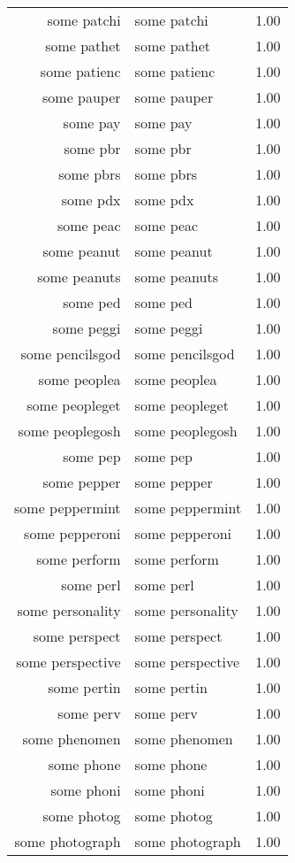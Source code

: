 \begin{table}[ht]
\begin{tabular}{rlr}
  some patchi & some patchi & 1.00 \\ 
  some pathet & some pathet & 1.00 \\ 
  some patienc & some patienc & 1.00 \\ 
  some pauper & some pauper & 1.00 \\ 
  some pay & some pay & 1.00 \\ 
  some pbr & some pbr & 1.00 \\ 
  some pbrs & some pbrs & 1.00 \\ 
  some pdx & some pdx & 1.00 \\ 
  some peac & some peac & 1.00 \\ 
  some peanut & some peanut & 1.00 \\ 
  some peanuts & some peanuts & 1.00 \\ 
  some ped & some ped & 1.00 \\ 
  some peggi & some peggi & 1.00 \\ 
  some pencilsgod & some pencilsgod & 1.00 \\ 
  some peoplea & some peoplea & 1.00 \\ 
  some peopleget & some peopleget & 1.00 \\ 
  some peoplegosh & some peoplegosh & 1.00 \\ 
  some pep & some pep & 1.00 \\ 
  some pepper & some pepper & 1.00 \\ 
  some peppermint & some peppermint & 1.00 \\ 
  some pepperoni & some pepperoni & 1.00 \\ 
  some perform & some perform & 1.00 \\ 
  some perl & some perl & 1.00 \\ 
  some personality & some personality & 1.00 \\ 
  some perspect & some perspect & 1.00 \\ 
  some perspective & some perspective & 1.00 \\ 
  some pertin & some pertin & 1.00 \\ 
  some perv & some perv & 1.00 \\ 
  some phenomen & some phenomen & 1.00 \\ 
  some phone & some phone & 1.00 \\ 
  some phoni & some phoni & 1.00 \\ 
  some photog & some photog & 1.00 \\ 
  some photograph & some photograph & 1.00 \\ 

\end{tabular}
\end{table}
